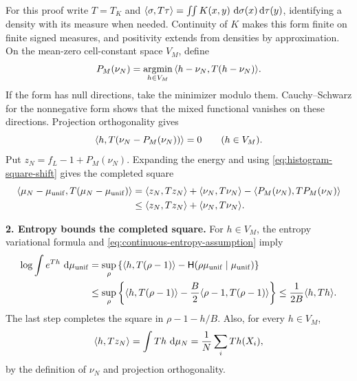\documentclass[11pt,reqno]{amsart}
\numberwithin{equation}{section}
\theoremstyle{plain}
\theoremstyle{definition}
\DeclarePairedDelimiter{\ip}{\langle}{\rangle}
\newcommand{\dd}{\mathop{}\!\mathrm d}
\newcommand{\Hr}{\mathsf H}
\newcommand{\muunif}{\mu_{\mathrm{unif}}}
\begin{document}
For this proof write $T=T_K$ and
$\ip{\sigma,T\tau}=\iint K(x,y)\,\dd\sigma(x)\dd\tau(y)$,
identifying a density with its measure when needed.  Continuity of $K$ makes this form finite on finite signed measures, and positivity extends from densities by approximation.  On the mean-zero cell-constant space $V_M$, define
\begin{equation}
 P_M(\nu_N)=\underset{h\in V_M}{\operatorname{argmin}}\,
                  \ip{h-\nu_N,T(h-\nu_N)}.
 \label{eq:explicit-histogram-square-shift}
\end{equation}
If the form has null directions, take the minimizer modulo them.  Cauchy--Schwarz for the nonnegative form shows that the mixed functional vanishes on these directions.  Projection orthogonality gives
\begin{equation}
 \ip{h,T(\nu_N-P_M(\nu_N))}=0
 \qquad(h\in V_M).
 \label{eq:histogram-square-shift}
\end{equation}
Put $z_N=f_L-1+P_M(\nu_N)$.  Expanding the energy and using \eqref{eq:histogram-square-shift} gives the completed square
\begin{equation}
 \begin{aligned}
 \ip{\mu_N-\muunif,T(\mu_N-\muunif)}
 &=\ip{z_N,Tz_N}+\ip{\nu_N,T\nu_N}
                   -\ip{P_M(\nu_N),TP_M(\nu_N)}\\
 &\le\ip{z_N,Tz_N}+\ip{\nu_N,T\nu_N}.
 \end{aligned}
 \label{eq:direct-square-completion}
\end{equation}

\textbf{2. Entropy bounds the completed square.}
For $h\in V_M$, the entropy variational formula and \eqref{eq:continuous-entropy-assumption} imply
\begin{equation}
 \begin{aligned}
 \log\int e^{Th}\,\dd\muunif
 &=\sup_\rho\left\{\ip{h,T(\rho-1)}-\Hr(\rho\muunif\mid\muunif)\right\}\\
 &\le\sup_\rho\left\{\ip{h,T(\rho-1)}
                         -\frac B2\ip{\rho-1,T(\rho-1)}\right\}
 \le\frac1{2B}\ip{h,Th}.
 \end{aligned}
 \label{eq:dual-log-hls}
\end{equation}
The last step completes the square in $\rho-1-h/B$.  Also, for every $h\in V_M$,
\begin{equation}
 \ip{h,Tz_N}=\int Th\,\dd\mu_N
            =\frac1N\sum_iTh(X_i),
 \label{eq:coarse-gaussian-pairing}
\end{equation}
by the definition of $\nu_N$ and projection orthogonality.
\end{document}
